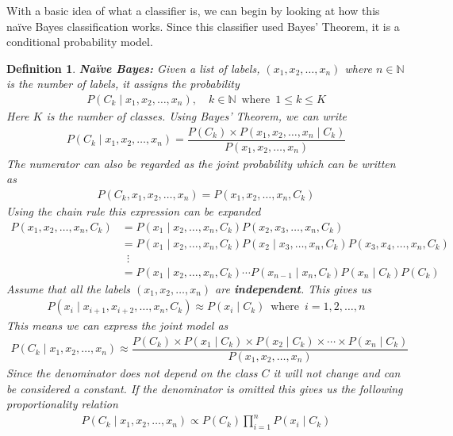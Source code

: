 \documentclass[12pt,twoside]{report}   %
\newcommand{\bb}{\textbf}
\newcommand{\N}{\mathbb{N}}
\newtheorem{definition}[theorem]{Definition}
\begin{document}
With a basic idea of what a classifier is, we can begin by looking at how this na\"{i}ve Bayes classification works. Since this classifier used Bayes' Theorem, it is a conditional probability model.
\begin{definition}\label{naive def}
\bb{Na\"{i}ve Bayes:} Given a list of labels, $(x_1,x_2,\ldots,x_n)$ where $n\in\N$ is the number of labels, it assigns the probability
\begin{align*}
P(C_k\mid x_1,x_2,\ldots,x_n),\quad k\in\N\,\text{ where }\,1\leq k\leq K
\end{align*}
Here $K$ is the number of classes. Using Bayes' Theorem, we can write
\begin{align}
P(C_k\mid x_1,x_2,\ldots,x_n) = \dfrac{P(C_k)\times P(x_1,x_2,\ldots,x_n\mid C_k)}{P(x_1,x_2,\ldots,x_n)}\label{4.1}
\end{align}
The numerator can also be regarded as the joint probability which can be written as
\begin{align*}
P(C_k,x_1,x_2,\ldots,x_n) = P(x_1,x_2,\ldots,x_n,C_k)
\end{align*}
Using the chain rule this expression can be expanded
\begin{align*}
P(x_1,x_2,\ldots,x_n,C_k) &= P(x_1\mid x_2,\ldots,x_n,C_k)P(x_2,x_3,\ldots,x_n,C_k)\\
&= P(x_1\mid x_2,\ldots,x_n,C_k)P(x_2\mid x_3,\ldots,x_n,C_k)P(x_3,x_4,\ldots,x_n,C_k)\\
&\hspace{6pt}\vdots\\
&= P(x_1\mid x_2,\ldots,x_n,C_k)\cdots P(x_{n-1}\mid x_n,C_k)P(x_n\mid C_k)P(C_k)
\end{align*}
Assume that all the labels $(x_1,x_2,\ldots,x_n)$ are \bb{independent}. This gives us
\begin{align*}
P(x_i\mid x_{i+1},x_{i+2},\ldots,x_n,C_k)\approx P(x_i\mid C_k)\,\text{ where }\,i=1,2,\ldots,n
\end{align*}
This means we can express the joint model as
\begin{align*}
P(C_k\mid x_1,x_2,\ldots,x_n) \approx \dfrac{P(C_k)\times P(x_1\mid C_k)\times P(x_2\mid C_k)\times\cdots\times P(x_n\mid C_k)}{P(x_1,x_2,\ldots,x_n)}
\end{align*}
Since the denominator does not depend on the class $C$ it will not change and can be considered a constant. If the denominator is  omitted this gives us the following proportionality relation
\begin{align}
P(C_k\mid x_1,x_2,\ldots,x_n) \propto P(C_k)\prod^n_{i=1}P(x_i\mid C_k)\label{4.2}

\end{align}
\end{definition}
\end{document}
